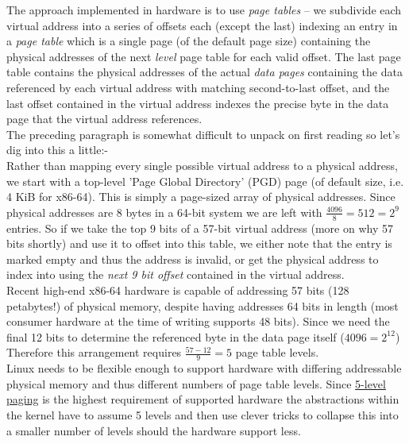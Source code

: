 The approach implemented in hardware is to use \emph{page tables} -- we
subdivide each virtual address into a series of offsets each (except the last)
indexing an entry in a \emph{page table} which is a single page (of the default
page size) containing the physical addresses of the next \emph{level} page table
for each valid offset. The last page table contains the physical addresses of
the actual \emph{data pages} containing the data referenced by each virtual
address with matching second-to-last offset, and the last offset contained in
the virtual address indexes the precise byte in the data page that the virtual
address references.\\

The preceding paragraph is somewhat difficult to unpack on first reading so
let's dig into this a little:-\\

Rather than mapping every single possible virtual address to a physical address,
we start with a top-level 'Page Global Directory' (PGD) page (of default size,
i.e. 4 KiB for x86-64). This is simply a page-sized array of physical
addresses. Since physical addresses are 8 bytes in a 64-bit system we are left
with $\frac{4096}{8} = 512 = 2^9$ entries. So if we take the top 9 bits of a
57-bit virtual address (more on why 57 bits shortly) and use it to offset into
this table, we either note that the entry is marked empty and thus the address
is invalid, or get the physical address to index into using the \emph{next 9 bit
offset} contained in the virtual address.\\

Recent high-end x86-64 hardware is capable of addressing 57 bits (128
petabytes!) of physical memory, despite having addresses 64 bits in length (most
consumer hardware at the time of writing supports 48 bits). Since we need the
final 12 bits to determine the referenced byte in the data page itself ($4096 =
2^{12}$) Therefore this arrangement requires $\frac{57 - 12}{9} = 5$ page table
levels.\\

Linux needs to be flexible enough to support hardware with differing addressable
physical memory and thus different numbers of page table levels. Since
\href{https://en.wikipedia.org/wiki/Intel_5-level_paging}{5-level paging} is the
highest requirement of supported hardware the abstractions within the kernel
have to assume 5 levels and then use clever tricks to collapse this into a
smaller number of levels should the hardware support less.\\

